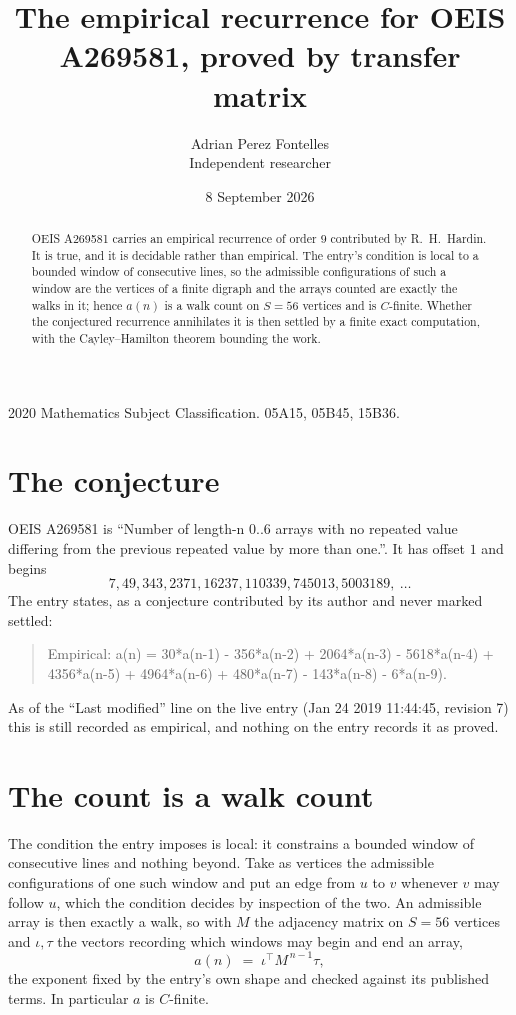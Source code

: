 \documentclass[11pt,a4paper]{article}
\title{The empirical recurrence for OEIS A269581, proved by transfer matrix}
\author{Adrian Perez Fontelles\\ \small Independent researcher}
\date{8 September 2026}
\theoremstyle{plain}
\theoremstyle{definition}
\begin{document}
\maketitle

\begin{abstract}
OEIS A269581 carries an empirical recurrence of order $9$ contributed by R.~H.~Hardin. It is
true, and it is decidable rather than empirical. The entry's condition is local to a bounded window of consecutive lines, so
the admissible configurations of such a window are the vertices of a finite digraph and the
arrays counted are exactly the walks in it; hence $a(n)$ is a walk count on $S=56$ vertices
and is $C$-finite. Whether the conjectured recurrence annihilates it is then settled by a
finite exact computation, with the Cayley--Hamilton theorem bounding the work.
\end{abstract}

\noindent\small 2020 Mathematics Subject Classification. 05A15, 05B45, 15B36.\normalsize

\section{The conjecture}

OEIS A269581 is ``Number of length-n 0..6 arrays with no repeated value differing from the previous repeated value by more than one.''. It has offset $1$ and begins
\[
7, 49, 343, 2371, 16237, 110339, 745013, 5003189,\ \dots
\]
The entry states, as a conjecture contributed by its author and never marked settled:
\begin{quote}
Empirical: a(n) = 30*a(n-1) - 356*a(n-2) + 2064*a(n-3) - 5618*a(n-4) + 4356*a(n-5) + 4964*a(n-6) + 480*a(n-7) - 143*a(n-8) - 6*a(n-9).
\end{quote}
As of the ``Last modified'' line on the live entry (Jan 24 2019 11:44:45, revision 7) this is still
recorded as empirical, and nothing on the entry records it as proved.

\section{The count is a walk count}

The condition the entry imposes is local: it constrains a bounded window of consecutive lines and nothing beyond. Take as
vertices the admissible configurations of one such window and put an edge from $u$ to $v$
whenever $v$ may follow $u$, which the condition decides by inspection of the two. An
admissible array is then exactly a walk, so with $M$ the adjacency matrix on $S=56$ vertices
and $\iota,\tau$ the vectors recording which windows may begin and end an array,
\[
a(n)\;=\;\iota^{\!\top}M^{\,n-1}\tau ,
\]
the exponent fixed by the entry's own shape and checked against its published terms. In
particular $a$ is $C$-finite.
\end{document}
